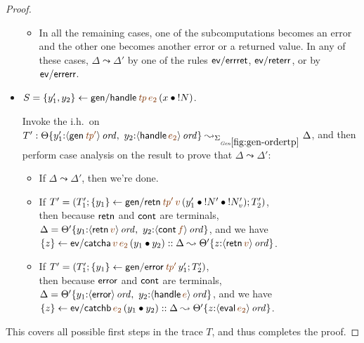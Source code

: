 \begin{proof}
\begin{itemize}
\begin{itemize}
\item In all the remaining cases, one of the subcomputations becomes
  an error and the other one becomes another error or a returned
  value.  In any of these cases, $\Delta \leadsto \Delta'$ by one of
  the rules ${\sf ev/errret}$, ${\sf ev/reterr}$, or by ${\sf
    ev/errerr}$.

\end{itemize}

\medskip
\item $S = \trstep{y_1', y_2}{{\sf gen/handle}\,\lf{{\it tp}}\,\lf{e_2}\,(\tfuser{x}{\tbangr{N}})}$.

Invoke the i.h.~on  
$T' :  \tackon{\Theta}{y_1'{:}\istrue{\susp{{\sf gen}\,\lf{{\it tp}'}}}, ~ 
                        y_2{:}\istrue{\susp{{\sf handle}\,\lf{e_2}}}}
\leadsto_{\siggenordertp} \Delta$, and then perform case analysis on the result
to prove that $\Delta \leadsto \Delta'$:

\begin{itemize}
\item If $\Delta \leadsto \Delta'$, then we're done. 
\item If $T' = \left(T_1'; \trstep{y_1}{{\sf gen/retn}\,\lf{{\it tp}'}\,\lf{v}\,(\tfuser{y_1'}{\tfuser{\tbangr{N'}}{\tbangr{N_v'}}})}; T_2'\right)$,
\\
then because ${\sf retn}$ and ${\sf cont}$ are 
terminals, $\Delta = \tackon{\Theta'}{
         y_1{:}\istrue{\susp{{\sf retn}\,\lf{v}}}, ~
         y_2{:}\istrue{\susp{{\sf cont}\,\lf{f}}}}$, and 
we have $\trstep{z}{{\sf ev/catcha}\,\lf{v}\,\lf{e_2}\,(\tfuser{y_1}{y_2})}
:: \Delta \leadsto \tackon{\Theta'}{z{:}\istrue{\susp{{\sf retn}\,\lf{v}}}}$.

\item If $T' = \left(T_1'; \trstep{y_1}{{\sf gen/error}\,\lf{{\it tp}'}\,y_1'}; T_2'\right)$,
\\
then because ${\sf error}$ and ${\sf cont}$ are terminals,
$\Delta = \tackon{\Theta'}{
         y_1{:}\istrue{\susp{{\sf error}}}, ~
         y_2{:}\istrue{\susp{{\sf handle}\,\lf{e}}}}$, and we have
$\trstep{z}{{\sf ev/catchb}\,\lf{e_2}\,(\tfuser{y_1}{y_2})} :: \Delta \leadsto \tackon{\Theta'}{z{:}\istrue{\susp{{\sf eval}\,\lf{e_2}}}}$.

\end{itemize}

\end{itemize}

\noindent
This covers all possible first steps in the trace $T$, and thus completes
the proof.
\end{proof}

